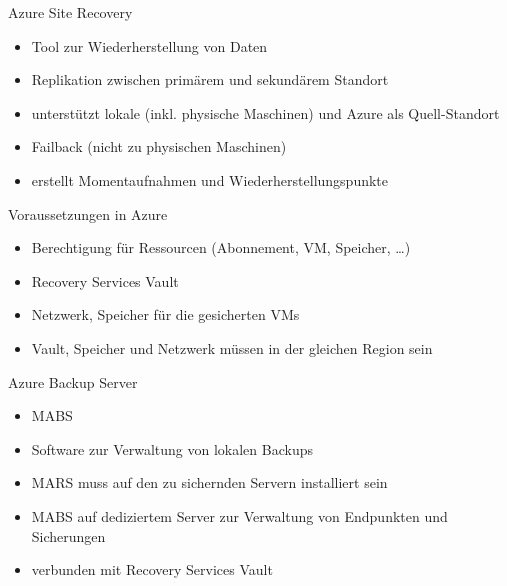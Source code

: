 
\begin{flashcard}[Definition]{Azure Site Recovery}
  \begin{itemize}
    \item Tool zur Wiederherstellung von Daten
    \item Replikation zwischen primärem und sekundärem Standort
    \item unterstützt lokale (inkl. physische Maschinen) und Azure als Quell-Standort
    \item Failback (nicht zu physischen Maschinen)
    \item erstellt Momentaufnahmen und Wiederherstellungspunkte
  \end{itemize}
\end{flashcard}

\begin{flashcard}[Definition]{Voraussetzungen in Azure}
  \begin{itemize}
    \item Berechtigung für Ressourcen (Abonnement, VM, Speicher, \ldots)
    \item Recovery Services Vault
    \item Netzwerk, Speicher für die gesicherten VMs
    \item[!] Vault, Speicher und Netzwerk müssen in der gleichen Region sein
  \end{itemize}
\end{flashcard}

\begin{flashcard}[Definition]{Azure Backup Server}
  \begin{itemize}
    \item MABS
    \item Software zur Verwaltung von lokalen Backups
    \item MARS muss auf den zu sichernden Servern installiert sein
    \item MABS auf dediziertem Server zur Verwaltung von Endpunkten und Sicherungen
    \item verbunden mit Recovery Services Vault
  \end{itemize}
\end{flashcard}

